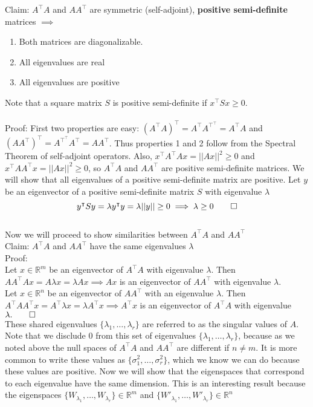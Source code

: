 \documentclass[11pt]{article}
\begin{document}
Claim: $A^\intercal A$ and $AA^\intercal$ are symmetric (self-adjoint), {\bf positive semi-definite} matrices $\implies$
\begin{enumerate}
\item Both matrices are diagonalizable.
\item All eigenvalues are real
\item All eigenvalues are positive
\end{enumerate}
Note that a square matrix $S$ is positive semi-definite if $x^\intercal Sx \geq 0$.\\\\
Proof: First two properties are easy: $(A^\intercal A)^\intercal = A^\intercal A^{\intercal^\intercal} = A^\intercal A$ and $(AA^\intercal)^\intercal = A^{\intercal^\intercal}A^\intercal = AA^\intercal$. Thus properties 1 and 2 follow from the Spectral Theorem of self-adjoint operators. Also, $x^\intercal A^\intercal Ax = \vert\vert Ax \vert\vert^2 \geq 0$ and $x^\intercal AA^\intercal x = \vert\vert Ax \vert\vert^2 \geq 0$, so $A^\intercal A$ and $AA^\intercal$ are positive semi-definite matrices. We will show that all eigenvalues of a positive semi-definite matrix are positive. Let $y$ be an eigenvector of a positive semi-definite matrix $S$ with eigenvalue $\lambda$
\begin{equation*}
y^\intercal Sy = \lambda y^\intercal y = \lambda \vert\vert y \vert\vert \geq 0 \implies \lambda \geq 0 \qed
\end{equation*}\\

Now we will proceed to show similarities between $A^\intercal A$ and $AA^\intercal$ \\

Claim: $A^\intercal A$ and $AA^\intercal$ have the same eigenvalues $\lambda$\\
Proof:\\
Let $x \in \mathbb{R}^m$ be an eigenvector of $A^\intercal A$ with eigenvalue $\lambda$. Then $AA^\intercal Ax = A\lambda x = \lambda Ax \implies Ax$ is an eigenvector of $AA^\intercal$ with eigenvalue $\lambda$.\\
Let $x \in \mathbb{R}^n$ be an eigenvector of $AA^\intercal$ with an eigenvalue $\lambda$. Then $A^\intercal AA^\intercal x = A^\intercal \lambda x = \lambda A^\intercal x \implies A^\intercal x$ is an eigenvector of $A^\intercal A$ with eigenvalue $\lambda. \qed$\\

These shared eigenvalues $\{\lambda_1,\dots,\lambda_r\}$ are referred to as the singular values of $A$. Note that we disclude 0 from this set of eigenvalues $\{\lambda_1,\dots,\lambda_r\}$, because as we noted above the null spaces of $A^\intercal A$ and $AA^\intercal$ are different if $n \neq m$. It is more common to write these values as $\{\sigma_1^2,\dots,\sigma_r^2\}$, which we know we can do because these values are positive. Now we will show that the eigenspaces that correspond to each eigenvalue have the same dimension. This is an interesting result because the eigenspaces $\{W_{\lambda_1},\dots,W_{\lambda_r}\} \in \mathbb{R}^m$ and $\{W'_{\lambda_1},\dots,W'_{\lambda_r}\} \in \mathbb{R}^n$ \\
\end{document}
